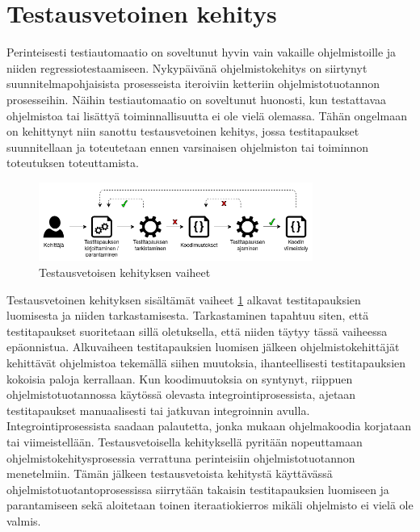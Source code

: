 \section{Testausvetoinen kehitys} \label{ch:07_testausvetoinen_kehitys}

  Perinteisesti testiautomaatio on soveltunut hyvin vain vakaille ohjelmistoille ja niiden regressiotestaamiseen.
  Nykypäivänä ohjelmistokehitys on siirtynyt suunnitelmapohjaisista prosesseista iteroiviin ketteriin ohjelmistotuotannon prosesseihin.
  Näihin testiautomaatio on soveltunut huonosti, kun testattavaa ohjelmistoa tai lisättyä toiminnallisuutta ei ole vielä olemassa.
  Tähän ongelmaan on kehittynyt niin sanottu testausvetoinen kehitys, jossa testitapaukset suunnitellaan ja toteutetaan ennen varsinaisen ohjelmiston tai toiminnon toteutuksen toteuttamista.

  \begin{figure}[H]
    \centering
    \includegraphics[width=0.8\textwidth]{assets/testausvetoinen-kehitys.png}
    \caption{Testausvetoisen kehityksen vaiheet}
    \label{fig:testausvetoinen-kehitys}
  \end{figure}

  Testausvetoinen kehityksen sisältämät vaiheet \ref{fig:testausvetoinen-kehitys} alkavat testitapauksien luomisesta ja niiden tarkastamisesta.
  Tarkastaminen tapahtuu siten, että testitapaukset suoritetaan sillä oletuksella, että niiden täytyy tässä vaiheessa epäonnistua.
  Alkuvaiheen testitapauksien luomisen jälkeen ohjelmistokehittäjät kehittävät ohjelmistoa tekemällä siihen muutoksia, ihanteellisesti testitapauksien kokoisia paloja kerrallaan.
  Kun koodimuutoksia on syntynyt, riippuen ohjelmistotuotannossa käytössä olevasta integrointiprosessista, ajetaan testitapaukset manuaalisesti tai jatkuvan integroinnin avulla.
  Integrointiprosessista saadaan palautetta, jonka mukaan ohjelmakoodia korjataan tai viimeistellään.
  Testausvetoisella kehityksellä pyritään nopeuttamaan ohjelmistokehitysprosessia verrattuna perinteisiin ohjelmistotuotannon menetelmiin.
  Tämän jälkeen testausvetoista kehitystä käyttävässä ohjelmistotuotantoprosessissa siirrytään takaisin testitapauksien luomiseen ja parantamiseen sekä aloitetaan toinen iteraatiokierros mikäli ohjelmisto ei vielä ole valmis.


